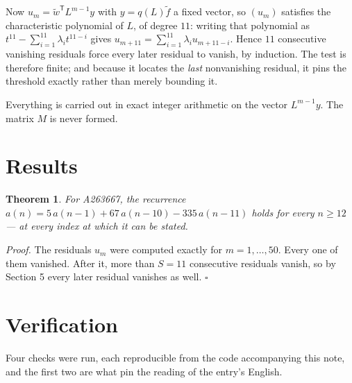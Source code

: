 \documentclass[11pt]{article}
\newtheorem{theorem}{Theorem}
\theoremstyle{definition}
\begin{document}
Now $u_m = \tilde w^{\mathsf T} L^{m-1} y$ with $y = q(L)\tilde f$ a fixed vector, so $(u_m)$ satisfies the characteristic polynomial of $L$, of degree $11$: writing that polynomial as $t^{11} - \sum_{i=1}^{11} \lambda_i t^{11-i}$ gives $u_{m+11} = \sum_{i=1}^{11} \lambda_i u_{m+11-i}$. Hence $11$ consecutive vanishing residuals force every later residual to vanish, by induction. The test is therefore finite; and because it locates the {\itshape last} nonvanishing residual, it pins the threshold exactly rather than merely bounding it.

Everything is carried out in exact integer arithmetic on the vector $L^{m-1}y$. The matrix $M$ is never formed.

\section{Results}

\begin{theorem} For A263667, the recurrence $a(n) = 5\,a(n-1) + 67\,a(n-10) - 335\,a(n-11)$ holds for every $n \ge 12$ --- at every index at which it can be stated.\end{theorem}

{\itshape Proof.} The residuals $u_m$ were computed exactly for $m = 1,\dots,50$. Every one of them vanished. After it, more than $S = 11$ consecutive residuals vanish, so by Section 5 every later residual vanishes as well. $\square$

\section{Verification}

Four checks were run, each reproducible from the code accompanying this note, and the first two are what pin the reading of the entry's English.
\end{document}
